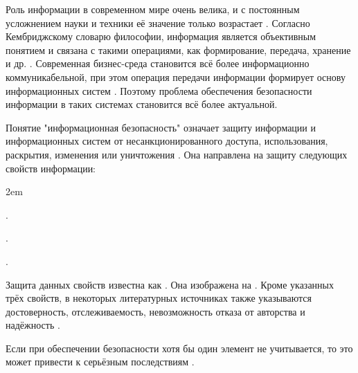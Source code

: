 %
Роль информации в современном мире очень велика, и с постоянным усложнением науки и техники её значение только возрастает .
%
Согласно Кембриджскому словарю философии, информация является объективным понятием и связана с такими операциями, как формирование, передача, хранение и др. .
%
Современная бизнес-среда становится всё более информационно коммуникабельной, при этом операция передачи информации формирует основу информационных систем . 
%
Поэтому проблема обеспечения безопасности информации в таких системах становится всё более актуальной.

%
Понятие "информационная безопасность" означает защиту информации и информационных систем от несанкционированного доступа, использования, раскрытия, изменения или уничтожения 
. 
%
Она направлена на защиту следующих свойств информации:
\begin{description}
	\leftskip2em%
	\setlength{\itemsep}{0pt}%
	\setlength{\parsep}{0pt}%

	\item[Целостность] .

	\item[Конфиденциальность] .

	\item[Доступность] .
\end{description}

%
Защита данных свойств известна как .
%
Она изображена на . 
%
Кроме указанных трёх свойств, в некоторых литературных источниках также указываются достоверность, отслеживаемость, невозможность отказа от авторства и надёжность . 


%
Если при обеспечении безопасности хотя бы один элемент  не учитывается, то это может привести к серьёзным последствиям .
%
%
%


